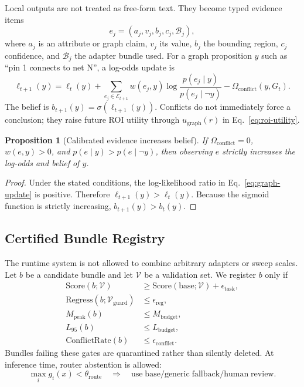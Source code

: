 \documentclass[11pt]{article}
\newtheorem{proposition}{Proposition}
\begin{document}
Local outputs are not treated as free-form text.
They become typed evidence items
\begin{equation}
  e_j=(a_j,v_j,b_j,c_j,\mathcal{B}_j),
\end{equation}
where $a_j$ is an attribute or graph claim, $v_j$ its value, $b_j$ the bounding region, $c_j$ confidence, and $\mathcal{B}_j$ the adapter bundle used.
For a graph proposition $y$ such as ``pin 1 connects to net N'', a log-odds update is
\begin{equation}
  \ell_{t+1}(y)
  =
  \ell_t(y)
  +
  \sum_{e_j\in\mathcal{E}_{t+1}}
  w(e_j,y)
  \log
  \frac{p(e_j\mid y)}{p(e_j\mid \neg y)}
  -
  \Omega_{\mathrm{conflict}}(y,G_t).
  \label{eq:graph-update}
\end{equation}
The belief is $b_{t+1}(y)=\sigma(\ell_{t+1}(y))$.
Conflicts do not immediately force a conclusion; they raise future ROI utility through $u_{\mathrm{graph}}(r)$ in Eq.~\ref{eq:roi-utility}.

\begin{proposition}[Calibrated evidence increases belief]
If $\Omega_{\mathrm{conflict}}=0$, $w(e,y)>0$, and $p(e\mid y)>p(e\mid\neg y)$, then observing $e$ strictly increases the log-odds and belief of $y$.
\end{proposition}

\begin{proof}
Under the stated conditions, the log-likelihood ratio in Eq.~\ref{eq:graph-update} is positive.
Therefore $\ell_{t+1}(y)>\ell_t(y)$.
Because the sigmoid function is strictly increasing, $b_{t+1}(y)>b_t(y)$.
\end{proof}

\subsection{Certified Bundle Registry}

The runtime system is not allowed to combine arbitrary adapters or sweep scales.
Let $b$ be a candidate bundle and let $\mathcal{V}$ be a validation set.
We register $b$ only if
\begin{align}
  \mathrm{Score}(b;\mathcal{V}) &\ge \mathrm{Score}(\mathrm{base};\mathcal{V})+\epsilon_{\mathrm{task}},\\
  \mathrm{Regress}(b;\mathcal{V}_{\mathrm{guard}}) &\le \epsilon_{\mathrm{reg}},\\
  M_{\mathrm{peak}}(b) &\le M_{\mathrm{budget}},\\
  L_{95}(b) &\le L_{\mathrm{budget}},\\
  \mathrm{ConflictRate}(b) &\le \epsilon_{\mathrm{conflict}}.
\end{align}
Bundles failing these gates are quarantined rather than silently deleted.
At inference time, router abstention is allowed:
\begin{equation}
  \max_i g_i(x)<\theta_{\mathrm{route}}
  \quad\Rightarrow\quad
  \mathrm{use\;base/generic\;fallback/human\;review}.
\end{equation}
\end{document}
